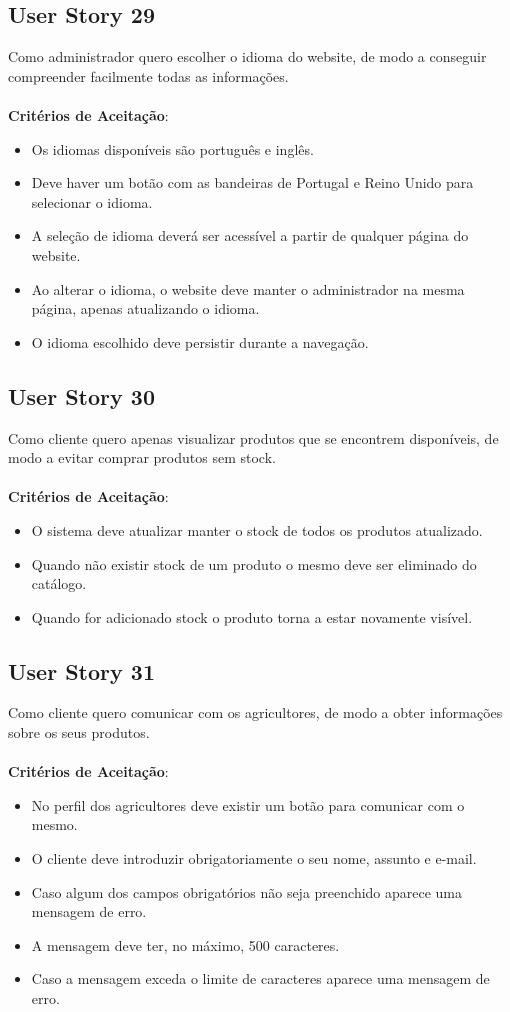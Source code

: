 \documentclass[a4paper,11pt]{article}
\begin{document}
\subsection{User Story 29}
Como administrador quero escolher o idioma do website, de modo a conseguir compreender facilmente todas as informações.\\\\
\textbf{Critérios de Aceitação}:
\begin{itemize}
  \item Os idiomas disponíveis são português e inglês.
  \item Deve haver um botão com as bandeiras de Portugal e Reino Unido para selecionar o idioma.
  \item A seleção de idioma deverá ser acessível a partir de qualquer página do website.
  \item Ao alterar o idioma, o website deve manter o administrador na mesma página, apenas atualizando o idioma.
  \item O idioma escolhido deve persistir durante a navegação.
\end{itemize}
\subsection{User Story 30}
Como cliente quero apenas visualizar produtos que se encontrem disponíveis, de modo a evitar comprar produtos sem stock.\\\\
\textbf{Critérios de Aceitação}:
\begin{itemize}
  \item O sistema deve atualizar manter o stock de todos os produtos atualizado.
  \item Quando não existir stock de um produto o mesmo deve ser eliminado do catálogo.
  \item Quando for adicionado stock o produto torna a estar novamente visível.
\end{itemize}
\subsection{User Story 31}
Como cliente quero comunicar com os agricultores, de modo a obter informações sobre os seus produtos.\\\\
\textbf{Critérios de Aceitação}:
\begin{itemize}
  \item No perfil dos agricultores deve existir um botão para comunicar com o mesmo.
  \item O cliente deve introduzir obrigatoriamente o seu nome, assunto e e-mail.
  \item Caso algum dos campos obrigatórios não seja preenchido aparece uma mensagem de erro.
  \item A mensagem deve ter, no máximo, 500 caracteres.
  \item Caso a mensagem exceda o limite de caracteres aparece uma mensagem de erro.
\end{itemize}
\end{document}
